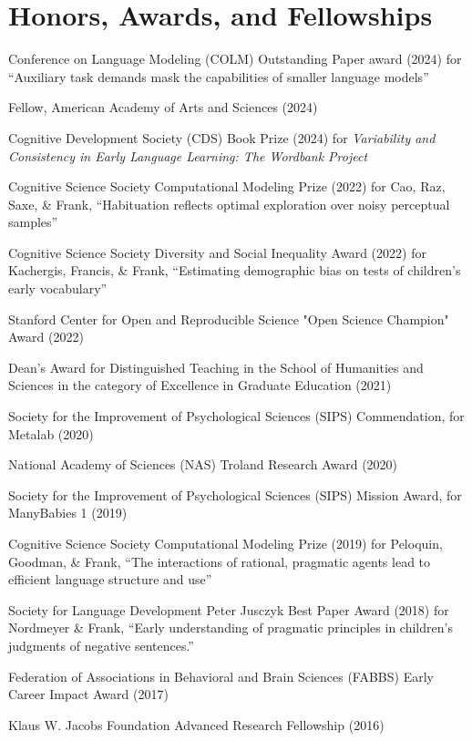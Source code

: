 \documentclass{article}
\renewenvironment{itemize}{
\begin{list}{}{
  \setlength{\leftmargin}{1.5em}
  }
  }{
\end{list}
}
\begin{document}
\section*{Honors, Awards, and Fellowships}

\begin{itemize}
  \item Conference on Language Modeling (COLM) Outstanding Paper award (2024) for ``Auxiliary task demands mask the capabilities of smaller language models'' 
  \item Fellow, American Academy of Arts and Sciences (2024)
  \item Cognitive Development Society (CDS) Book Prize (2024) for {\it Variability and Consistency in Early Language Learning: The Wordbank Project}
  \item Cognitive Science Society Computational Modeling Prize (2022) for Cao, Raz, Saxe, \& Frank, ``Habituation reflects optimal exploration over noisy perceptual samples''
  \item Cognitive Science Society Diversity and Social Inequality Award (2022) for Kachergis, Francis, \& Frank, ``Estimating demographic bias on tests of children's early vocabulary''
 \item Stanford Center for Open and Reproducible Science "Open Science Champion" Award (2022)
 \item Dean’s Award for Distinguished Teaching in the School of Humanities and Sciences in the category of Excellence in
Graduate Education (2021)
   \item Society for the Improvement of Psychological Sciences (SIPS) Commendation, for Metalab (2020)
  \item National Academy of Sciences (NAS) Troland Research Award (2020)
  \item Society for the Improvement of Psychological Sciences (SIPS) Mission Award, for ManyBabies 1 (2019)
  \item Cognitive Science Society Computational Modeling Prize (2019) for Peloquin, Goodman, \& Frank, ``The interactions of rational, pragmatic agents lead to efficient language structure and use''
  \item Society for Language Development Peter Jusczyk Best Paper Award (2018) for Nordmeyer \& Frank, ``Early understanding of pragmatic principles in children’s judgments of negative sentences.''
  \item Federation of Associations in Behavioral and Brain Sciences (FABBS) Early Career Impact Award (2017)
  \item Klaus W. Jacobs Foundation Advanced Research Fellowship (2016)

\end{itemize}
\end{document}
